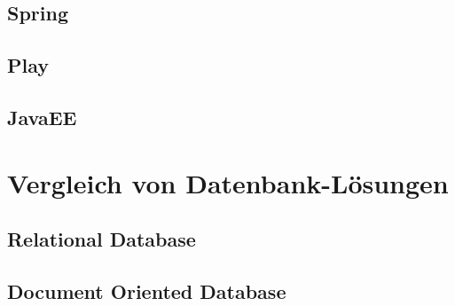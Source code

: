 \subsection{Spring}
\subsection{Play}
\subsection{JavaEE}
\section{Vergleich von Datenbank-Lösungen}
\subsection{Relational Database}
\subsection{Document Oriented Database}